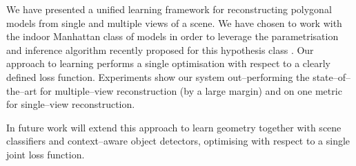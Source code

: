 We have presented a unified learning framework for reconstructing
polygonal models from single and multiple views of a scene. We have
chosen to work with the indoor Manhattan class of models in order to
leverage the parametrisation and inference algorithm recently proposed
for this hypothesis class \cite{Flint10eccv,Flint11}. Our approach to
learning performs a single optimisation with respect to a clearly
defined loss function. Experiments show our system out--performing the
state--of--the--art for multiple--view reconstruction (by a large
margin) and on one metric for single--view reconstruction.

In future work will extend this approach to learn geometry
together with scene classifiers and context--aware object detectors,
optimising with respect to a single joint loss function.

\newcommand{\CompFrame}[3]{\texttt{[image: figures/comparison\_frames/\#1\_frame\#2\_\#3.png]}}

